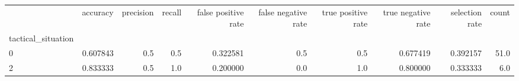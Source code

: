 \begin{tabular}{lrrrrrrrrr}
\toprule
{} &  accuracy &  precision &  recall &  false positive rate &  false negative rate &  true positive rate &  true negative rate &  selection rate &  count \\
tactical\_situation &           &            &         &                      &                      &                     &                     &                 &        \\
\midrule
0                  &  0.607843 &        0.5 &     0.5 &             0.322581 &                  0.5 &                 0.5 &            0.677419 &        0.392157 &   51.0 \\
2                  &  0.833333 &        0.5 &     1.0 &             0.200000 &                  0.0 &                 1.0 &            0.800000 &        0.333333 &    6.0 \\
\bottomrule
\end{tabular}
